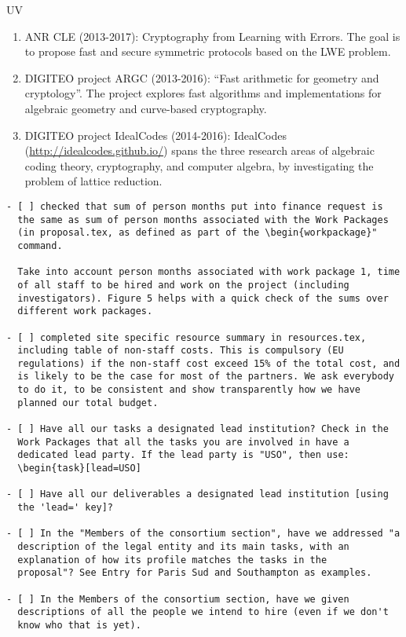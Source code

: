 \begin{sitedescription}{UV}
\begin{enumerate}
\item ANR CLE (2013-2017): Cryptography from Learning with Errors.
  The goal is to propose fast and secure symmetric protocols based on
  the LWE problem.
\item DIGITEO project ARGC (2013-2016): ``Fast arithmetic for geometry
  and cryptology''. The project explores fast algorithms and
  implementations for algebraic geometry and curve-based cryptography.
\item DIGITEO project IdealCodes (2014-2016): IdealCodes
  (\url{http://idealcodes.github.io/}) spans the three research areas
  of algebraic coding theory, cryptography, and computer algebra, by
  investigating the problem of lattice reduction.
\end{enumerate}
\end{sitedescription}



\begin{draft}
\vspace{1cm}

\begin{verbatim}
- [ ] checked that sum of person months put into finance request is
  the same as sum of person months associated with the Work Packages
  (in proposal.tex, as defined as part of the \begin{workpackage}"
  command.
  
  Take into account person months associated with work package 1, time
  of all staff to be hired and work on the project (including
  investigators). Figure 5 helps with a quick check of the sums over
  different work packages.

- [ ] completed site specific resource summary in resources.tex,
  including table of non-staff costs. This is compulsory (EU
  regulations) if the non-staff cost exceed 15% of the total cost, and
  is likely to be the case for most of the partners. We ask everybody
  to do it, to be consistent and show transparently how we have
  planned our total budget.

- [ ] Have all our tasks a designated lead institution? Check in the
  Work Packages that all the tasks you are involved in have a
  dedicated lead party. If the lead party is "USO", then use:
  \begin{task}[lead=USO]

- [ ] Have all our deliverables a designated lead institution [using
  the 'lead=' key]?

- [ ] In the "Members of the consortium section", have we addressed "a
  description of the legal entity and its main tasks, with an
  explanation of how its profile matches the tasks in the
  proposal"? See Entry for Paris Sud and Southampton as examples.

- [ ] In the Members of the consortium section, have we given
  descriptions of all the people we intend to hire (even if we don't
  know who that is yet). 
\end{verbatim}
\end{draft}

